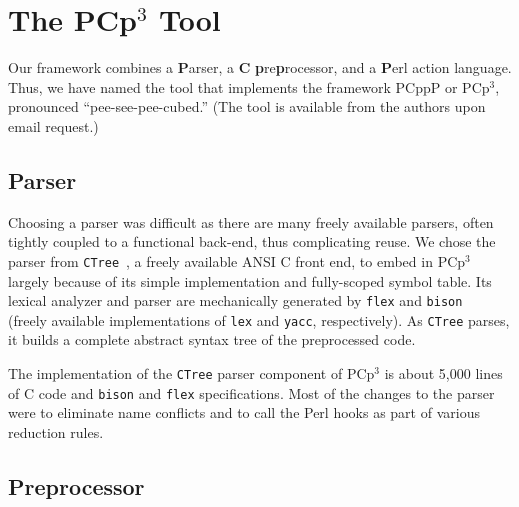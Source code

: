 \documentclass{article}
\newcommand{\pcp}{\mbox{\textsf{PCp}$^3$}}
\newcommand{\pcppp}{\mbox{\textsf{PCppP}}}
\newcommand{\Cpp}{\mbox{\textsf{cpp}}}
\newcommand{\Perl}{\mbox{Perl}}
\newcommand{\C}{\mbox{C}}
\begin{document}
\section{The \pcp{} Tool}
\label{sec:pcp3}

Our framework combines a
\textbf{\textsf{P}}arser, a \textbf{\textsf{C}}
\textbf{\textsf{p}}re\textbf{\textsf{p}}rocessor, and a
\textbf{\textsf{P}}erl action language.  Thus, we have named the tool
that implements the framework \pcppp{} or \pcp{}, pronounced
``pee-see-pee-cubed.''
(The tool is available from the authors upon email request.)

\subsection{Parser}
\label{ssec:parser}

Choosing a parser was difficult as there are many freely available
parsers, often tightly coupled to a functional back-end, thus
complicating reuse.  We chose the parser from \texttt{CTree}~\cite{CTree}, a
freely available ANSI \C{} front end, to embed in \pcp{}
largely because of its simple implementation and fully-scoped symbol
table.  Its lexical analyzer and parser are mechanically generated
by \texttt{flex} and \texttt{bison}~\cite{BisonAndFlex,Levine92} (freely
available implementations of \texttt{lex} and \texttt{yacc},
respectively).  As \texttt{CTree} parses, it builds a complete abstract
syntax tree of the preprocessed code.

The implementation of the \texttt{CTree} parser component of \pcp{} is
about 5,000 lines of \C{} code and \texttt{bison} and \texttt{flex}
specifications.  Most of the changes to the parser were to eliminate
name conflicts and to call the \Perl{} hooks as part of various
reduction rules.


\subsection{Preprocessor}
\label{ssec:preprocessor}

\end{document}
